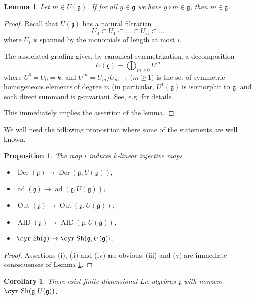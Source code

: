 \documentclass[11pt,reqno]{amsart}
\numberwithin{equation}{section}
\newtheorem{prop}[theorem]{Proposition}
\newtheorem{lemma}[theorem]{Lemma}
\newtheorem{cor}[theorem]{Corollary}
\theoremstyle{definition}
\newcommand{\Out}{{\operatorname{ Out}}}
\newcommand{\AID}{{\operatorname{ AID}}}
\newcommand{\Der}{{\operatorname{ Der}}}
\newcommand{\ad}{{\operatorname{ ad}}}
\def\Sha{\text{\cyr Sh}}
\def\g{\mathfrak g}
\begin{document}
\begin{lemma} \label{lem:adj}
Let $m\in U(\g )$. If for all $g\in \g$ we have $g\circ m\in \g$, then $m\in \g$.
\end{lemma}

\begin{proof}
Recall that $U(\g )$ has a natural filtration
$$
U_0\subset U_1\subset\dots\subset U_m\subset\dots
$$
where $U_i$ is spanned by the monomials of length at most $i$.

The associated grading gives, by canonical symmetrization, a decomposition
\begin{equation} \label{sum}
U(\g )=\bigoplus_{m\ge 0}U^m
\end{equation}
where $U^0=U_0=k$, and $U^m=U_m/U_{m-1}$ ($m\ge 1)$ is the set of symmetric homogeneous
elements of degree $m$ (in particular, $U^1(\g )$ is isomorphic to $\g$, and each direct summand
is $\g$-invariant. See, e.g. \cite[2.4.6, 2.4.10]{Dix} for details.

This immediately implies the assertion of the lemma.
\end{proof}

We will need the following proposition where some of the statements are well
known.


\begin{prop} \label{prop:emb}
The map $i$ induces $k$-linear injective maps
\begin{itemize}
\item[(i)] $\Der(\g)\to \Der(\g,U(\g))$;
\item[(ii)] $\ad(\g)\to \ad(\g,U(\g))$;
\item[(iii)] $\Out(\g)\to \Out(\g,U(\g))$;
\item[(iv)] $\AID(\g)\to \AID(\g,U(\g))$;
\item[(i)] $\Sha(\g)\to \Sha(\g,U(\g))$.
\end{itemize}
\end{prop}


\begin{proof}

Assertions (i), (ii) and (iv) are obvious, (iii) and (v)
are immediate consequences of Lemma \ref{lem:adj}.


\end{proof}

\begin{cor} \label{nonzero-Sha-U}
There exist finite-dimensional Lie algebras $\g$ with nonzero $\Sha (\g ,U(\g ))$.
\end{cor}
\end{document}
